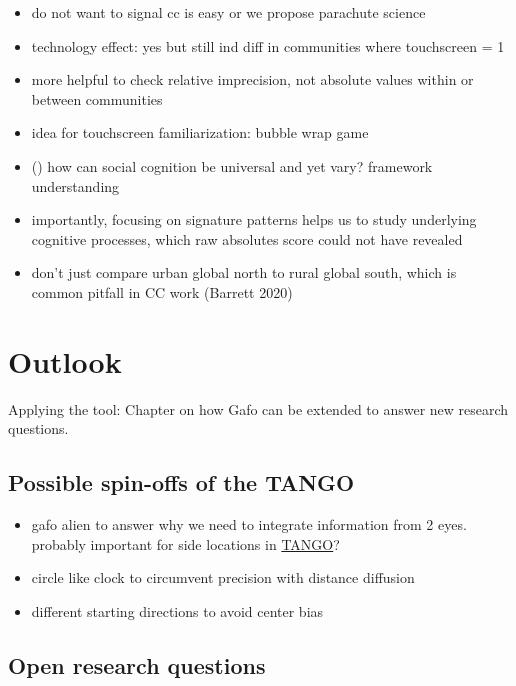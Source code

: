 \documentclass[
]{scrbook}
\providecommand{\tightlist}{%
  \setlength{\itemsep}{0pt}\setlength{\parskip}{0pt}}
\begin{document}
\begin{itemize}
\tightlist
\item
  do not want to signal cc is easy or we propose parachute science
\item
  technology effect: yes but still ind diff in communities where touchscreen = 1
\item
  more helpful to check relative imprecision, not absolute values within or between communities
\item
  idea for touchscreen familiarization: bubble wrap game
\item
  () how can social cognition be universal and yet vary? framework understanding
\item
  importantly, focusing on signature patterns helps us to study underlying cognitive processes, which raw absolutes score could not have revealed
\item
  don't just compare urban global north to rural global south, which is common pitfall in CC work (Barrett 2020)
\end{itemize}

\section{Outlook}\label{outlook}

Applying the tool: Chapter on how Gafo can be extended to answer new research questions.

\subsection{Possible spin-offs of the TANGO}\label{possible-spin-offs-of-the-tango}

\begin{itemize}
\tightlist
\item
  gafo alien to answer why we need to integrate information from 2 eyes. probably important for side locations in \hyperref[acronyms_TANGO]{TANGO}?
\item
  circle like clock to circumvent precision with distance diffusion
\item
  different starting directions to avoid center bias
\end{itemize}

\subsection{Open research questions}\label{open-research-questions}
\end{document}
